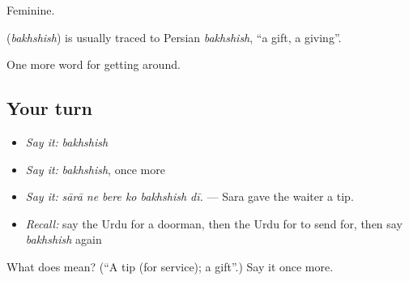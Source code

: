 Feminine.

\begin{cousinweb}
\textbf{} (\emph{bakhshish}) is usually traced to Persian \emph{bakhshish}, \textquotedblleft{}a gift, a giving\textquotedblright{}.
\end{cousinweb}

\begin{grammarlens}[title={What you've built}]
One more word for getting around.
\end{grammarlens}

\subsection*{Your turn}
\begin{itemize}
\raggedright
  \item \emph{Say it:} \emph{bakhshish}
  \item \emph{Say it:} \emph{bakhshish}, once more
  \item \emph{Say it:} \emph{sārā ne bere ko bakhshish dī.} — Sara gave the waiter a tip.
  \item \emph{Recall:} say the Urdu for a doorman, then the Urdu for to send for, then say \emph{bakhshish} again
\end{itemize}

\begin{tcolorbox}[breakable,colback=teal!4,colframe=teal!35!black,title={Before you move on}]
What does  mean? (\textquotedblleft{}A tip (for service); a gift\textquotedblright{}.) Say it once more.
\end{tcolorbox}
